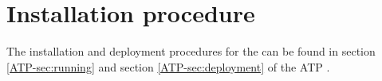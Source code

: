 \chapter{Installation procedure}
\label{chap:install}
The installation and deployment procedures for the \applicationname{} can be found in section \ref*{ATP-sec:running} and section \ref*{ATP-sec:deployment} of the ATP \cite{atp}.

